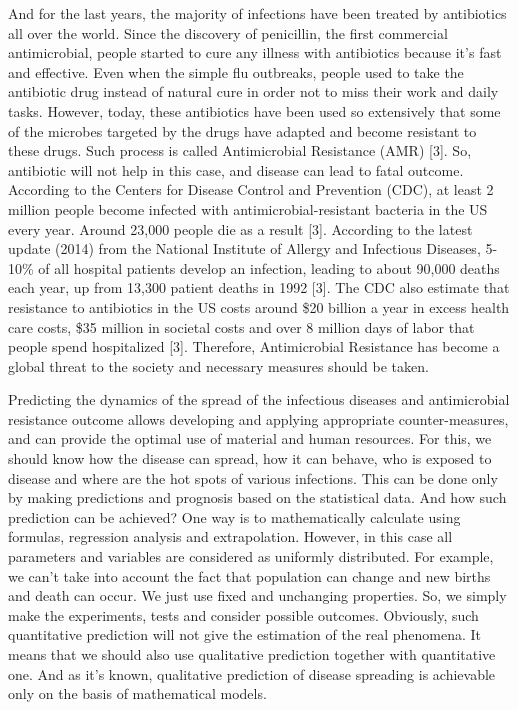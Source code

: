 And for the last years, the majority of infections have been treated by antibiotics all over the world. Since the discovery of penicillin, the first commercial antimicrobial, people started to cure any illness with antibiotics because it’s fast and effective. Even when the simple flu outbreaks, people used to take the antibiotic drug instead of natural cure in order not to miss their work and daily tasks. However, today, these antibiotics have been used so extensively that some of the microbes targeted by the drugs have adapted and become resistant to these drugs. Such process is called Antimicrobial Resistance (AMR) [3]. So, antibiotic will not help in this case, and disease can lead to fatal outcome. According to the Centers for Disease Control and Prevention (CDC), at least 2 million people become infected with antimicrobial-resistant bacteria in the US every year. Around 23,000 people die as a result [3]. According to the latest update (2014) from the National Institute of Allergy and Infectious Diseases, 5-10\% of all hospital patients develop an infection, leading to about 90,000 deaths each year, up from 13,300 patient deaths in 1992 [3]. The CDC also estimate that resistance to antibiotics in the US costs around \$20 billion a year in excess health care costs, \$35 million in societal costs and over 8 million days of labor that people spend hospitalized [3]. Therefore, Antimicrobial Resistance has become a global threat to the society and necessary measures should be taken.

Predicting the dynamics of the spread of the infectious diseases and antimicrobial resistance outcome allows developing and applying appropriate counter-measures, and can provide the optimal use of material and human resources.  For this, we should know how the disease can spread, how it can behave, who is exposed to disease and where are the hot spots of various infections. This can be done only by making predictions and prognosis based on the statistical data. And how such prediction can be achieved? One way is to mathematically calculate using formulas, regression analysis and extrapolation. However, in this case all parameters and variables are considered as uniformly distributed. For example, we can’t take into account the fact that population can change and new births and death can occur. We just use fixed and unchanging properties. So, we simply make the experiments, tests and consider possible outcomes. Obviously, such quantitative prediction will not give the estimation of the real phenomena. It means that we should also use qualitative prediction together with quantitative one. And as it’s known, qualitative prediction of disease spreading is achievable only on the basis of mathematical models.

